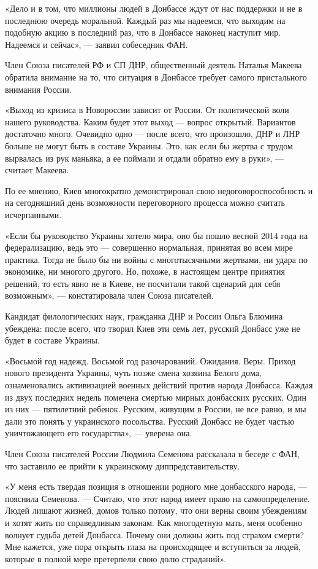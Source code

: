 «Дело и в том, что миллионы людей в Донбассе ждут от нас поддержки и не в
последнюю очередь моральной. Каждый раз мы надеемся, что выходим на подобную
акцию в последний раз, что в Донбассе наконец наступит мир. Надеемся и сейчас»,
— заявил собеседник ФАН.

Член Союза писателей РФ и СП ДНР, общественный деятель Наталья Макеева обратила
внимание на то, что ситуация в Донбассе требует самого пристального внимания
России.

«Выход из кризиса в Новороссии зависит от России. От политической воли нашего
руководства. Каким будет этот выход — вопрос открытый. Вариантов достаточно
много. Очевидно одно — после всего, что произошло, ДНР и ЛНР больше не могут
быть в составе Украины. Это, как если бы жертва с трудом вырвалась из рук
маньяка, а ее поймали и отдали обратно ему в руки», — считает Макеева.

По ее мнению, Киев многократно демонстрировал свою недоговороспособность и на
сегодняшний день возможности переговорного процесса можно считать исчерпанными.

«Если бы руководство Украины хотело мира, оно бы пошло весной 2014 года на
федерализацию, ведь это — совершенно нормальная, принятая во всем мире
практика. Тогда не было бы ни войны с многотысячными жертвами, ни удара по
экономике, ни многого другого. Но, похоже, в настоящем центре принятия решений,
то есть явно не в Киеве, не посчитали такой сценарий для себя возможным», —
констатировала член Союза писателей.

Кандидат филологических наук, гражданка ДНР и России Ольга Блюмина убеждена:
после всего, что творил Киев эти семь лет, русский Донбасс уже не будет в
составе Украины.

«Восьмой год надежд. Восьмой год разочарований. Ожидания. Веры. Приход нового
президента Украины, чуть позже смена хозяина Белого дома, ознаменовались
активизацией военных действий против народа Донбасса. Каждая из двух последних
недель помечена смертью мирных донбасских русских. Один из них — пятилетний
ребенок. Русским, живущим в России, не все равно, и мы дали это понять у
украинского посольства. Русский Донбасс не будет частью уничтожающего его
государства», — уверена она.

Член Союза писателей России Людмила Семенова рассказала в беседе с ФАН, что
заставило ее прийти к украинскому диппредставительству.

«У меня есть твердая позиция в отношении родного мне донбасского народа, —
пояснила Семенова. — Считаю, что этот народ имеет право на самоопределение.
Людей лишают жизней, домов только потому, что они верны своим убеждениям и
хотят жить по справедливым законам. Как многодетную мать, меня особенно волнует
судьба детей Донбасса. Почему они должны жить под страхом смерти? Мне кажется,
уже пора открыть глаза на происходящее и вступиться за людей, которые в полной
мере претерпели свою долю страданий».

